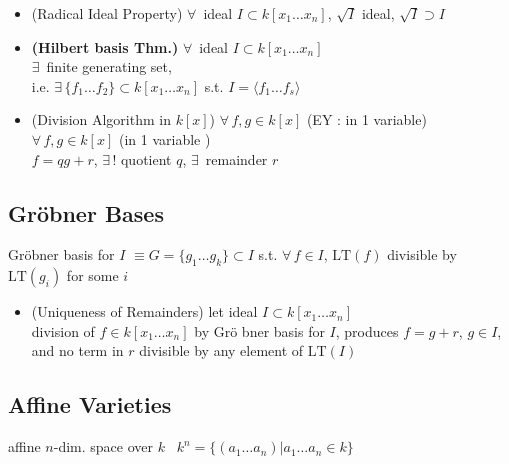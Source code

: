 \begin{itemize}
\item (Radical Ideal Property) $\forall \, $ ideal $I\subset k[x_1 \dots x_n]$, $\sqrt{I}$ ideal, $\sqrt{I} \supset I$
\item \textbf{(Hilbert basis Thm.)} $\forall \, $ ideal $I\subset k[x_1\dots x_n]$ \\
$\exists \, $ finite generating set, \\
i.e. $\exists \, \lbrace f_1 \dots f_2 \rbrace \subset k [x_1 \dots x_n]$ s.t. $I=\langle f_1 \dots f_s \rangle$
\item (Division Algorithm in $k[x]$) $\forall \, f,g \in  k[x]$ (EY : in 1 variable) \\
$\forall \, f, g \in k[x]$ (in 1 variable )\\
$f= qg + r$, $\exists \, !$ quotient $q$, $\exists \, $ remainder $r$
\end{itemize}

\subsection{}

\subsection{Gr\"obner Bases}

\begin{definition}[3.1]
  Gr\"obner basis for $I$ $\equiv G = \lbrace g_1 \dots g_k \rbrace \subset I$ s.t. $\forall \, f \in I$, $\text{LT}(f)$ divisible by $\text{LT}(g_i)$ for some $i$
\end{definition}

\begin{itemize}
\item (Uniqueness of Remainders) let ideal $I\subset k[x_1 \dots x_n]$ \\
division of $f\in k[x_1 \dots x_n]$ by Gr\"o bner basis for $I$, produces $f=g+r$, $g\in I$, and no term in $r$ divisible by any element of $\text{LT}(I)$
\end{itemize}





\subsection{Affine Varieties}

affine $n$-dim. space over $k$ \quad \, $k^n = \lbrace (a_1 \dots a_n ) | a_1 \dots a_n \in k \rbrace$

